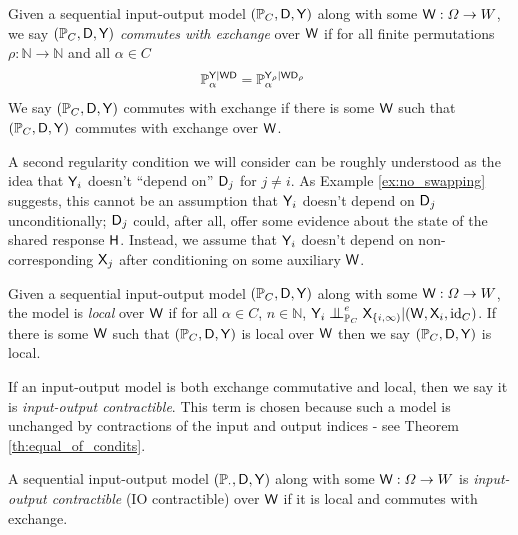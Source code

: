 \begin{definition}\label{def:caus_exch}
Given a sequential input-output model $(\mathbb{P}_C,\mathsf{D},\mathsf{Y})$ along with some $\mathsf{W}:\Omega\to W$, we say $(\mathbb{P}_C,\mathsf{D},\mathsf{Y})$ \emph{commutes with exchange} over $\mathsf{W}$ if for all finite permutations $\rho:\mathbb{N}\to\mathbb{N}$ and all $\alpha\in C$
\begin{align}
    \mathbb{P}_\alpha^{\mathsf{Y}|\mathsf{WD}} &=  \mathbb{P}_\alpha^{\mathsf{Y}_\rho|\mathsf{WD}_\rho}
\end{align}
We say $(\mathbb{P}_C,\mathsf{D},\mathsf{Y})$ commutes with exchange if there is some $\mathsf{W}$ such that $(\mathbb{P}_C,\mathsf{D},\mathsf{Y})$ commutes with exchange over $\mathsf{W}$.   
\end{definition}

A second regularity condition we will consider can be roughly understood as the idea that $\mathsf{Y}_i$ doesn't ``depend on'' $\mathsf{D}_j$ for $j\neq i$. As Example \ref{ex:no_swapping} suggests, this cannot be an assumption that $\mathsf{Y}_i$ doesn't depend on $\mathsf{D}_j$ unconditionally; $\mathsf{D}_j$ could, after all, offer some evidence about the state of the shared response $\mathsf{H}$. Instead, we assume that $\mathsf{Y}_i$ doesn't depend on non-corresponding $\mathsf{X}_j$ after conditioning on some auxiliary $\mathsf{W}$.

\begin{definition}[Locality]\label{def:caus_cont}
Given a sequential input-output model $(\mathbb{P}_C,\mathsf{D},\mathsf{Y})$ along with some $\mathsf{W}:\Omega\to W$, the model is \emph{local} over $\mathsf{W}$ if for all $\alpha\in C$, $n\in \mathbb{N}$, $\RV{Y}_i\CI^e_{\prob{P}_C} \RV{X}_{\{i,\infty)}|(\RV{W},\RV{X}_i,\text{id}_C)$. If there is some $\mathsf{W}$ such that $(\mathbb{P}_C,\mathsf{D},\mathsf{Y})$ is local over $\mathsf{W}$ then we say $(\mathbb{P}_C,\mathsf{D},\mathsf{Y})$ is local.
\end{definition}

If an input-output model is both exchange commutative and local, then we say it is \emph{input-output contractible}. This term is chosen because such a model is unchanged by contractions of the input and output indices - see Theorem \ref{th:equal_of_condits}.

\begin{definition}\label{def:ccontract}
A sequential input-output model $(\mathbb{P}_\cdot,\mathsf{D},\mathsf{Y})$ along with some $\mathsf{W}:\Omega\to W$ is \emph{input-output contractible} (IO contractible) over $\mathsf{W}$ if it is local and commutes with exchange.
\end{definition}

